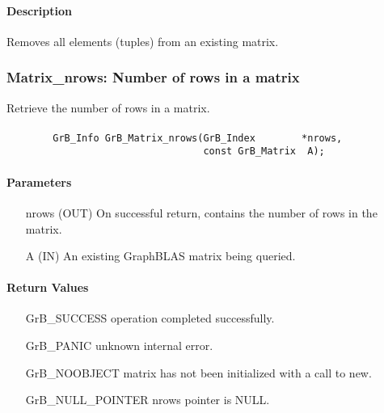 \paragraph{Description}

Removes all elements (tuples) from an existing matrix.

\subsubsection{{\sf Matrix\_nrows}: Number of rows in a matrix}

Retrieve the number of rows in a matrix.

\paragraph{\syntax}

\begin{verbatim}
        GrB_Info GrB_Matrix_nrows(GrB_Index        *nrows,
                                  const GrB_Matrix  A);
\end{verbatim}

\paragraph{Parameters}

\begin{itemize}[leftmargin=1.1in]
    \item[{\sf nrows}] ({\sf OUT}) On successful return, contains the number of rows in the matrix.
    \item[{\sf A}] ({\sf IN}) An existing GraphBLAS matrix being queried.
\end{itemize}


\paragraph{Return Values}

\begin{itemize}[leftmargin=2.1in]
\item[{\sf GrB\_SUCCESS}]   operation completed successfully.
\item[{\sf GrB\_PANIC}]     unknown internal error.
\item[{\sf GrB\_NOOBJECT}]  matrix has not been initialized with a call to {\sf new}.
\item[{\sf GrB\_NULL\_POINTER}]    {\sf nrows} pointer is {\sf NULL}.
\end{itemize}

